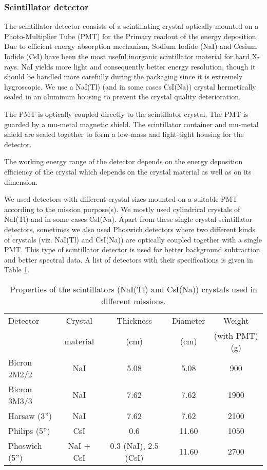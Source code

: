 \subsubsection{Scintillator detector}
\label{sssec:scin}
The scintillator detector consists of a scintillating crystal optically mounted on 
a Photo-Multiplier Tube (PMT) for the Primary readout of the energy deposition.
Due to efficient energy absorption mechanism, Sodium Iodide (NaI) and Cesium
Iodide (CsI) have been the most useful inorganic scintillator material for hard
X-rays. NaI yields more light and consequently better energy resolution, though
it should be handled more carefully during the packaging since it is extremely
hygroscopic. We use a NaI(Tl) (and in some cases CsI(Na)) crystal hermetically
sealed in an aluminum housing to prevent the crystal quality deterioration.

The PMT is optically coupled directly to the scintillator crystal. The PMT is guarded by
a mu-metal magnetic shield. The scintillator container and mu-metal shield are
sealed together to form a low-mass and light-tight housing for the detector.

The working energy range of the detector depends on the energy deposition
efficiency of the crystal which depends on the crystal material as well as on
its dimension.

We used detectors with different crystal sizes mounted on a suitable PMT according 
to the mission purpose(s). We mostly used cylindrical crystals of NaI(Tl)
and in some cases CsI(Na). Apart from these single crystal scintillator detectors,
sometimes we also used Phoswich detectors where two different kinds of crystals (viz.
NaI(Tl) and CsI(Na)) are optically coupled together with a single PMT. This type of 
scintillator detector is used for better background subtraction and better spectral 
data. A list of detectors with their specifications is given in Table \ref{tab:scnt}.

\begin{table}[h]
 \begin{center}
  \begin{tabular}{lcccc}
   \hline
   Detector & Crystal & Thickness & Diameter & Weight\\
   & material & (cm) & (cm) & (with PMT)(g)\\
   \hline
   Bicron 2M2/2 & NaI & 5.08 & 5.08 & 900\\
   Bicron 3M3/3 & NaI & 7.62 & 7.62 & 1900\\
   Harsaw (3'') & NaI & 7.62 & 7.62 & 2100\\
   Philips (5'') & CsI & 0.6 & 11.60 & 1050\\
   Phoswich (5'') & NaI + CsI & 0.3 (NaI), 2.5 (CsI) & 11.60 & 2700\\
   \hline
  \end{tabular}
  \caption{Properties of the scintillators (NaI(Tl) and CsI(Na)) crystals used
  in different missions.}
  \label{tab:scnt}
 \end{center}
\end{table}

